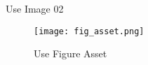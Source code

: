 \documentclass{article}
\begin{document}
    Use Image 02
    \begin{figure}[h!]
        \centering
        \texttt{[image: fig\_asset.png]}
        \caption{Use Figure Asset}
    \end{figure}
\end{document}
